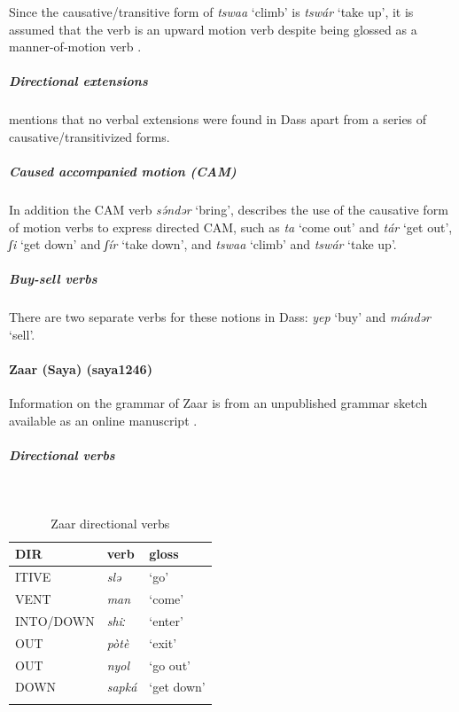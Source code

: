 Since the causative/transitive form of \textit{tswaa} `climb' is \textit{tswár} `take up', it is assumed that the verb is an upward motion verb despite being glossed as a manner-of-motion verb \citep[3]{caronDottAkaZodi2002}. 

\subparagraph{Directional extensions}



\citet[3]{caronDottAkaZodi2002} mentions that no verbal extensions were found in Dass apart from a series of causative/transitivized forms. 

\subparagraph{Caused accompanied motion (CAM)}



In addition the CAM verb \textit{sə́ndər} `bring', \citet[3]{caronDottAkaZodi2002} describes the use of the causative form of motion verbs to express directed CAM, such as \textit{ta} `come out' and \textit{tár} `get out', \textit{ʃi} `get down' and \textit{ʃír} `take down', and \textit{tswaa} `climb' and \textit{tswár} `take up'. 

\subparagraph{Buy-sell verbs}



There are two separate verbs for these notions in Dass: \textit{yep} `buy' and \textit{mándər} `sell'. 

\paragraph*{Zaar (Saya) (saya1246)}

Information on the grammar of Zaar is from an unpublished grammar sketch available as an online manuscript \citep{caronZaarGrammaticalSketch2011}. 

\newpage
\subparagraph{Directional verbs}~



\begin{table}[H]
	\caption{Zaar directional verbs} 
	\label{tab:zaarV}
	\begin{tabular}{lll} %
		\lsptoprule
		DIR & verb & gloss   \\ %
		\midrule
		ITIVE & \textit{slə} & `go' \\
		VENT & \textit{man} & `come' \\
		INTO/DOWN & \textit{shiː} & `enter' \\
		OUT &\textit{pòtè} &`exit' \\	
		OUT &\textit{nyol} &`go out' \\
		DOWN & \textit{sapká} & `get down' \\
		\lspbottomrule
	\end{tabular}
\end{table}

